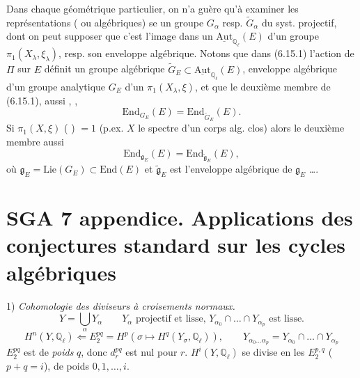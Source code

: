 \documentclass[11pt,a4paper]{article}
\begin{document}
Dans chaque  géométrique particulier, on n'a guère qu'à
examiner les représentations ( ou algébriques) se
  un groupe 
$G_\alpha$ resp. $\widetilde{G}_\alpha$  du syst. projectif, dont on
peut supposer que c'est l'image dans un $\underline{\mathrm{Aut}}_{\mathbb{Q}_\ell}(E)$
d'un groupe $\pi_1(X_\lambda, \xi_\lambda)$, resp. son enveloppe algébrique.
Notons que \struck{\ill{}} dans (6.15.1) l'action de $\Pi$ sur $E$ définit un
groupe algébrique $\widetilde{G}_E \subset \underline{\mathrm{Aut}}_{\mathbb{Q}_\ell}(E)$,
enveloppe algébrique d'un groupe analytique $G_E$ \struck{\ill{}}  d'un
$\pi_1(X_\lambda, \xi)$, et que le deuxième membre de (6.15.1), 
aussi , ,
\[
  \mathrm{End}_{G_E}(E) = \mathrm{End}_{\widetilde{G}_E}(E).
\]
Si $\pi_1(X,\xi)$ (\struck{\ill{}} ) $= 1$ (p.ex. $X$ le spectre
d'un corps alg. clos) alors le deuxième membre  aussi
\[
  \mathrm{End}_{\mathfrak{g}_E}(E) = \mathrm{End}_{\widetilde{\mathfrak{g}}_E}(E),
\]
où $\mathfrak{g}_E = \mathrm{Lie}(G_E) \subset \mathrm{End}(E)$ et $\widetilde{\mathfrak{g}}_E$
est l'enveloppe algébrique de $\mathfrak{g}_E$ ….


\section{SGA 7  appendice. Applications des conjectures standard sur les cycles algébriques}

1) \emph{Cohomologie des diviseurs à croisements normaux.}
\[
  Y = \bigcup_\alpha Y_\alpha \qquad Y_\alpha \text{ projectif et lisse, } Y_{\alpha_0} \cap \dots \cap Y_{\alpha_p} \text{ est lisse.}
\]
\[
  H^{n}(Y, \mathbb{Q}_\ell) \Longleftarrow E_2^{pq} = H^{p}(\sigma \longmapsto H^{q}(Y_\sigma, \mathbb{Q}_\ell)), \qquad
  Y_{\alpha_0 \dots \alpha_p} = Y_{\alpha_0} \cap \dots \cap Y_{\alpha_p}
\]
\struck{\ill{}} $E_2^{pq}$ est de \emph{poids} $q$, donc $d_r^{pq}$ est nul pour  $r$.
$H^{i}(Y, \mathbb{Q}_\ell)$ se divise en les $E_2^{p,q}$ ($p+q = i$), de poids $0, 1, \dots, i$.
\end{document}
